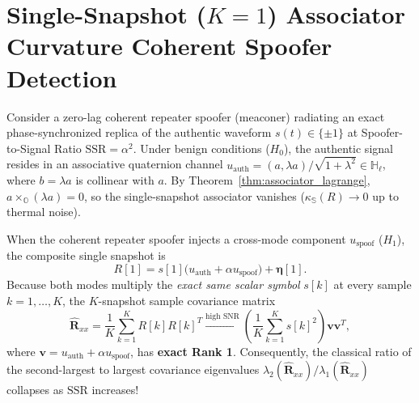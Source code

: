 \documentclass[journal,twoside]{IEEEtran}
\theoremstyle{definition}
\theoremstyle{remark}
\newcommand{\Ha}{\mathbb{H}}
\newcommand{\Oc}{\mathbb{O}}
\newcommand{\Se}{\mathbb{S}}
\newcommand{\kappas}{\kappa_{\Se}}
\begin{document}
\section{Single-Snapshot ($K=1$) Associator Curvature Coherent Spoofer Detection}
\label{sec:spoofer}
Consider a zero-lag coherent repeater spoofer (meaconer) radiating an exact phase-synchronized replica of the authentic waveform $s(t) \in \{\pm 1\}$ at Spoofer-to-Signal Ratio $\mathrm{SSR} = \alpha^2$. Under benign conditions ($H_0$), the authentic signal resides in an associative quaternion channel $u_{\mathrm{auth}} = (a, \lambda a)/\sqrt{1+\lambda^2} \in \Ha_\ell$, where $b = \lambda a$ is collinear with $a$. By Theorem~\ref{thm:associator_lagrange}, $a \times_{\Oc} (\lambda a) = 0$, so the single-snapshot associator vanishes ($\kappas(R) \to 0$ up to thermal noise).

When the coherent repeater spoofer injects a cross-mode component $u_{\mathrm{spoof}}$ ($H_1$), the composite single snapshot is
\begin{equation}
    R[1] = s[1]\bigl(u_{\mathrm{auth}} + \alpha u_{\mathrm{spoof}}\bigr) + \bm{\eta}[1].
\end{equation}
Because both modes multiply the \emph{exact same scalar symbol} $s[k]$ at every sample $k = 1,\dots,K$, the $K$-snapshot sample covariance matrix
\begin{equation}
    \hat{\bm{R}}_{xx} = \frac{1}{K}\sum_{k=1}^K R[k] R[k]^T \xrightarrow{\text{high SNR}} \left(\frac{1}{K}\sum_{k=1}^K s[k]^2\right) \bm{v}\bm{v}^T,
\end{equation}
where $\bm{v} = u_{\mathrm{auth}} + \alpha u_{\mathrm{spoof}}$, has \textbf{exact Rank 1}. Consequently, the classical ratio of the second-largest to largest covariance eigenvalues $\lambda_2(\hat{\bm{R}}_{xx}) / \lambda_1(\hat{\bm{R}}_{xx})$ collapses as $\mathrm{SSR}$ increases!
\end{document}
